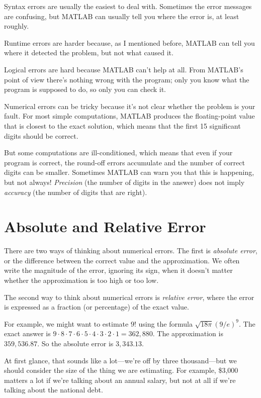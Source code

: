 Syntax errors are usually the easiest to deal with.  Sometimes the error messages
are confusing, but MATLAB can usually tell you where the error is, at
least roughly.

Runtime errors are harder because, as I mentioned before, MATLAB
can tell you where it detected the problem, but not what caused it.

Logical errors are hard because MATLAB can't help at all.  
From MATLAB's point of view there's nothing wrong with the program; only you
know what the program is supposed to do, so only you can check it.


Numerical errors can be tricky because it's not clear whether the
problem is your fault.  For most simple computations, MATLAB produces
the floating-point value that is closest to the exact solution, which
means that the first 15 significant digits should be correct.  

But some computations are ill-conditioned, which means that even if your program is correct, the round-off errors accumulate and the number of correct digits can be smaller.  Sometimes MATLAB can warn you that
this is happening, but not always!  \emph{Precision} (the number of digits
in the answer) does not imply \emph{accuracy} (the number of digits that
are right).


\section{Absolute and Relative Error}

There are two ways of thinking about numerical errors. 
The first is \emph{absolute error}, or the difference between the correct value and the approximation.  We often write the magnitude of the error,
ignoring its sign, when it doesn't matter whether the approximation
is too high or too low.
 

The second way to think about numerical errors is \emph{relative error}, where the error is expressed as a fraction (or percentage) of the exact value.

For example, we might want to estimate $9!$ using the formula 
$\sqrt {18 \pi} ( 9 / e)^9$.  The exact answer is $9 \cdot 8 \cdot 7 \cdot 6
\cdot 5 \cdot 4 \cdot 3 \cdot 2 \cdot 1 = 362,880$.  The approximation
is $359,536.87$.  So the absolute error is $3,343.13$.

At first glance, that sounds like a lot---we're off by three
thousand---but we should consider the size of the
thing we are estimating.  For example, \$3,000 matters a lot
if we're talking about an annual salary, but not at all if we're talking about the national debt.

